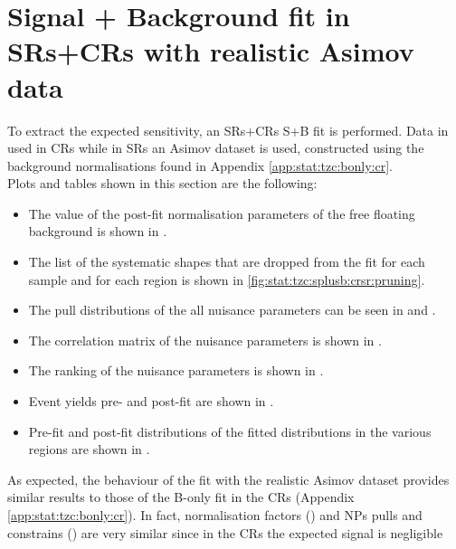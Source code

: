 \section{Signal + Background fit in SRs+CRs with realistic Asimov data}
\label{sec:stat:tzc:splusb:crsr}
To extract the expected sensitivity, an SRs+CRs S+B fit is performed. 
Data in used in CRs while in SRs an Asimov dataset is used,
constructed using the background normalisations found in Appendix \ref{app:stat:tzc:bonly:cr}.\\
Plots and tables shown in this section are the following:
\begin{itemize}
\item The value of the post-fit normalisation parameters of the free floating background is shown in .
\item The list of the systematic shapes that are dropped from the fit for each sample and for each region is shown in \cref{fig:stat:tzc:splusb:crsr:pruning}.
\item The pull distributions of the all nuisance parameters can be seen in  and . 
\item The correlation matrix of the nuisance parameters is shown in . 
\item The ranking of the nuisance parameters is shown in . 
\item Event yields pre- and post-fit are shown in . 
\item Pre-fit and post-fit distributions of the fitted distributions in the various regions are shown in .
\end{itemize}
As expected, the behaviour of the fit with the realistic Asimov dataset
provides similar results to those of the B-only fit in the CRs
(Appendix \ref{app:stat:tzc:bonly:cr}). 
In fact, normalisation factors () and NPs
pulls and constrains 
() 
are very similar since in the CRs the expected signal is negligible
